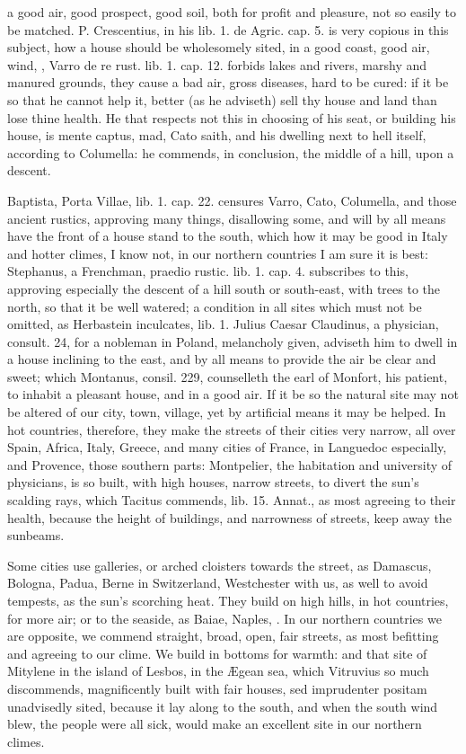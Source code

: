 {a good air, good prospect, good soil, both for profit and pleasure, not
so easily to be matched. P. Crescentius, in his lib. 1. de Agric. cap.
5. is very copious in this subject, how a house should be wholesomely
sited, in a good coast, good air, wind, \etc{}, Varro de re rust. lib. 1.
cap. 12. forbids lakes and rivers, marshy and manured grounds,
they cause a bad air, gross diseases, hard to be cured: if it be
so that he cannot help it, better (as he adviseth) sell thy house and
land than lose thine health. He that respects not this in choosing of
his seat, or building his house, is mente captus, mad, Cato
saith, and his dwelling next to hell itself, according to Columella: he
commends, in conclusion, the middle of a hill, upon a descent.

Baptista, Porta Villae, lib. 1. cap. 22. censures Varro, Cato,
Columella, and those ancient rustics, approving many things,
disallowing some, and will by all means have the front of a house stand
to the south, which how it may be good in Italy and hotter climes, I
know not, in our northern countries I am sure it is best: Stephanus, a
Frenchman, praedio rustic. lib. 1. cap. 4. subscribes to this,
approving especially the descent of a hill south or south-east, with
trees to the north, so that it be well watered; a condition in all
sites which must not be omitted, as Herbastein inculcates, lib. 1.
Julius Caesar Claudinus, a physician, consult. 24, for a nobleman in
Poland, melancholy given, adviseth him to dwell in a house inclining to
the east, and by all means to provide the air be clear and
sweet; which Montanus, consil. 229, counselleth the earl of Monfort,
his patient, to inhabit a pleasant house, and in a good air. If it be
so the natural site may not be altered of our city, town, village, yet
by artificial means it may be helped. In hot countries, therefore, they
make the streets of their cities very narrow, all over Spain, Africa,
Italy, Greece, and many cities of France, in Languedoc especially, and
Provence, those southern parts: Montpelier, the habitation and
university of physicians, is so built, with high houses, narrow
streets, to divert the sun's scalding rays, which Tacitus commends,
lib. 15. Annat., as most agreeing to their health, because the
height of buildings, and narrowness of streets, keep away the sunbeams.

Some cities use galleries, or arched cloisters towards the street, as
Damascus, Bologna, Padua, Berne in Switzerland, Westchester with us, as
well to avoid tempests, as the sun's scorching heat. They build on high
hills, in hot countries, for more air; or to the seaside, as Baiae,
Naples, \etc{}. In our northern countries we are opposite, we commend
straight, broad, open, fair streets, as most befitting and agreeing to
our clime. We build in bottoms for warmth: and that site of Mitylene in
the island of Lesbos, in the \AE{}gean sea, which Vitruvius so much
discommends, magnificently built with fair houses, sed imprudenter
positam unadvisedly sited, because it lay along to the south, and when
the south wind blew, the people were all sick, would make an excellent
site in our northern climes.

}

